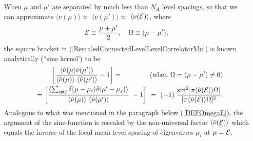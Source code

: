 \documentclass[aps,prb,preprint,onecolumn,amsmath,amssymb,superscriptaddress,eqsecnum,floatfix,scrartcl]{revtex4-1}
\begin{document}
When $\mu$ and $\mu'$ are separated by much less than $N_A$ level spacings, 
so that 
we can approximate
$\langle{ \nu}(\mu)\rangle \approx$ $ \langle{ \nu}(\mu')\rangle \approx$ $\langle{ \nu}({\cal E})\rangle$,
where
\begin{eqnarray}
{\cal E} \equiv {\mu+\mu'\over 2}, \quad \Omega \equiv (\mu - \mu'),
\end{eqnarray}
the square bracket in (\ref{RescaledConnectedLevelLevelCorrelatorMu})
 is known analytically
 (``sine kernel')
to be \cite{Fox1964,Nagao1992,BREZIN1993}
\begin{eqnarray}
\label{DEFSineSquareKernel}
&& \left [ {\langle{\hat  \nu}(\mu) {\hat \nu}(\mu')\rangle
 \over
\langle {\hat \nu}(\mu)\rangle \ \langle{\hat  \nu}(\mu')\rangle}
-1
\right ]  = \qquad \qquad ({\rm when} \ \Omega=(\mu-\mu') \not = 0)
\\ \nonumber
&&
= \left [
{
\langle \sum_{i \not = j}  \delta(\mu-\mu_i)   \delta(\mu'-\mu_j)\rangle 
\over \langle{\hat \nu}(\mu)\rangle \    \langle{\hat \nu}(\mu')\rangle} \ 
- 1
 \right ]
\ =  \ (-1)  \ 
{\sin^2[\pi \langle {\hat \nu}({\cal E})\rangle \Omega]\over
[\pi  \langle {\hat  \nu}({\cal E})\rangle \Omega]^2}.
\end{eqnarray}
Analogous to what was  mentioned in the paragraph below (\ref{DEFOmegaE}), the argument of the sine-function is rescaled by
the non-universal
factor $\langle {\hat \nu}({\cal E})\rangle$ which equals the inverse of the local mean level spacing of eigenvalues $\mu_i$ at $\mu={\cal E}$.

\end{document}
